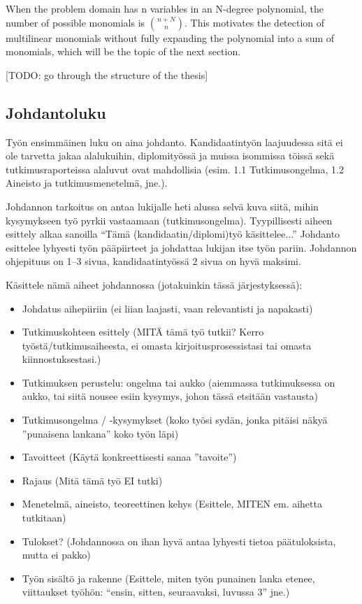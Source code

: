 When the problem domain has n variables in an N-degree polynomial, the number of possible monomials is \(\binom{n+N}{n}\).
This motivates the detection of multilinear monomials without fully expanding the polynomial into a sum of monomials, 
which will be the topic of the next section.

[TODO: go through the structure of the thesis]

\subsection{Johdantoluku}

Työn ensimmäinen luku on aina johdanto. Kandidaatintyön laajuudessa
sitä ei ole tarvetta jakaa alalukuihin, diplomityössä ja muissa
isommissa töissä sekä tutkimusraporteissa alaluvut ovat mahdollisia
(esim. 1.1 Tutkimusongelma, 1.2 Aineisto ja tutkimusmenetelmä, jne.).

Johdannon tarkoitus on antaa lukijalle heti alussa selvä kuva siitä,
mihin kysymykseen työ pyrkii vastaamaan
(tutkimusongelma). Tyypillisesti aiheen esittely alkaa sanoilla ``Tämä
(kandidaatin/diplomi)työ käsittelee...''  Johdanto esittelee lyhyesti
työn pääpiirteet ja johdattaa lukijan itse työn pariin. Johdannon
ohjepituus on 1--3 sivua, kandidaatintyössä 2 sivua on hyvä maksimi.

Käsittele nämä aiheet johdannossa (jotakuinkin tässä järjestyksessä):
%
\begin{itemize}
 \item Johdatus aihepiiriin 
(ei liian laajasti, vaan relevantisti ja napakasti)
%
 \item Tutkimuskohteen esittely (MITÄ tämä työ tutkii? 
Kerro työstä/tutkimusaiheesta, ei omasta kirjoitusprosessistasi 
tai omasta kiinnostuksestasi.)
%
 \item Tutkimuksen perustelu: ongelma tai aukko 
(aiemmassa tutkimuksessa on aukko, tai siitä nousee esiin 
kysymys, johon tässä etsitään vastausta)
%
 \item Tutkimusongelma / -kysymykset (koko työsi sydän, 
jonka pitäisi näkyä ''punaisena lankana'' koko työn läpi)
 \item Tavoitteet (Käytä konkreettisesti sanaa ''tavoite'')
 \item Rajaus (Mitä tämä työ EI tutki)
 \item Menetelmä, aineisto, teoreettinen kehys (Esittele, 
MITEN em. aihetta tutkitaan)
 \item Tulokset? (Johdannossa on ihan hyvä antaa lyhyesti 
tietoa päätuloksista, mutta ei pakko)
 \item Työn sisältö ja rakenne (Esittele, miten työn punainen 
lanka etenee, viittaukset työhön: 
``ensin, sitten, seuraavaksi, luvussa 3'' jne.)
\end{itemize}


